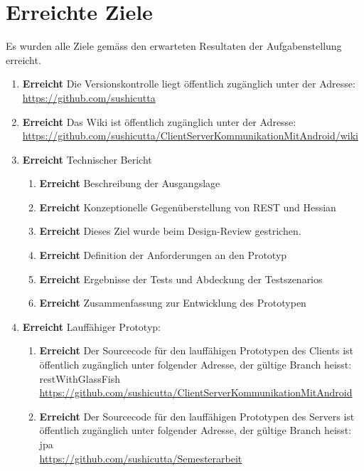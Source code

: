 \documentclass[abstracton, listof=totocnumbered,
bibliography=totocnumbered]{scrreprt}
\begin{document}
  \newpage  
  
  \chapter{Erreichte Ziele}
  
  Es wurden alle Ziele gemäss den erwarteten Resultaten der Aufgabenstellung
  erreicht.
  
  \begin{enumerate}
    \item \textbf{Erreicht} Die Versionskontrolle liegt öffentlich zugänglich unter der
          Adresse:\\
          \url{https://github.com/sushicutta}
    \item \textbf{Erreicht} Das Wiki ist öffentlich zugänglich unter der
          Adresse:\\
          \url{https://github.com/sushicutta/ClientServerKommunikationMitAndroid/wiki}
    \item \textbf{Erreicht} Technischer Bericht
    \begin{enumerate}
      \item \textbf{Erreicht} Beschreibung der Ausgangslage
      \item \textbf{Erreicht} Konzeptionelle Gegenüberstellung von \ac{REST} und
            Hessian
      \item \textbf{Erreicht} Dieses Ziel wurde beim Design-Review gestrichen. 
      \item \textbf{Erreicht} Definition der Anforderungen an den Prototyp
      \item \textbf{Erreicht} Ergebnisse der Tests und Abdeckung der Testszenarios
      \item \textbf{Erreicht} Zusammenfassung zur Entwicklung des Prototypen
    \end{enumerate}
    \item \textbf{Erreicht} Lauffähiger Prototyp:
    \begin{enumerate}
      \item \textbf{Erreicht} Der Sourcecode für den lauffähigen Prototypen des
      Clients ist öffentlich zugänglich unter folgender Adresse, der gültige Branch
      heisst: restWithGlassFish\\
      \url{https://github.com/sushicutta/ClientServerKommunikationMitAndroid}
      \item \textbf{Erreicht} Der Sourcecode für den lauffähigen Prototypen des
      Servers ist öffentlich zugänglich unter folgender Adresse, der gültige Branch
      heisst: jpa\\
      \url{https://github.com/sushicutta/Semesterarbeit}
    \end{enumerate}
  \end{enumerate}
  
\end{document}
